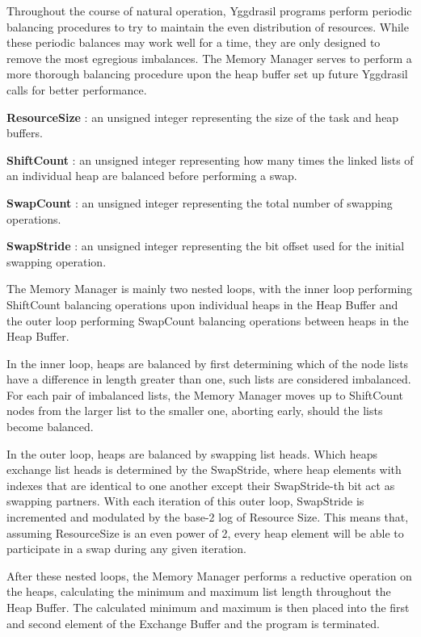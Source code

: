 \documentclass[onecolumn, draftclsnofoot,10pt, compsoc]{IEEEtran}
\newcounter{threesection}[subsubsection]
\begin{document}
Throughout the course of natural operation, Yggdrasil programs perform periodic balancing procedures to try to maintain the even distribution of resources. While these periodic balances may work well for a time, they are only designed to remove the most egregious imbalances. The Memory Manager serves to perform a more thorough balancing procedure upon the heap buffer set up future Yggdrasil calls for better performance.


\textbf{ResourceSize} : an unsigned integer representing the size of the task and heap buffers.

\noindent \textbf{ShiftCount} : an unsigned integer representing how many times the linked lists of an individual heap are balanced before performing a swap.

\noindent \textbf{SwapCount} : an unsigned integer representing the total number of swapping operations.

\noindent \textbf{SwapStride} : an unsigned integer representing the bit offset used for the initial swapping operation.


The Memory Manager is mainly two nested loops, with the inner loop performing ShiftCount balancing operations upon individual heaps in the Heap Buffer and the outer loop performing SwapCount balancing operations between heaps in the Heap Buffer.

In the inner loop, heaps are balanced by first determining which of the node lists have a difference in length greater than one, such lists are considered imbalanced. For each pair of imbalanced lists, the Memory Manager moves up to ShiftCount nodes from the larger list to the smaller one, aborting early, should the lists become balanced.

In the outer loop, heaps are balanced by swapping list heads. Which heaps exchange list heads is determined by the SwapStride, where heap elements with indexes that are identical to one another except their SwapStride-th bit act as swapping partners. With each iteration of this outer loop, SwapStride is incremented and modulated by the base-2 log of Resource Size. This means that, assuming ResourceSize is an even power of 2, every heap element will be able to participate in a swap during any given iteration.

After these nested loops, the Memory Manager performs a reductive operation on the heaps, calculating the minimum and maximum list length throughout the Heap Buffer. The calculated minimum and maximum is then placed into the first and second element of the Exchange Buffer and the program is terminated.
\end{document}
